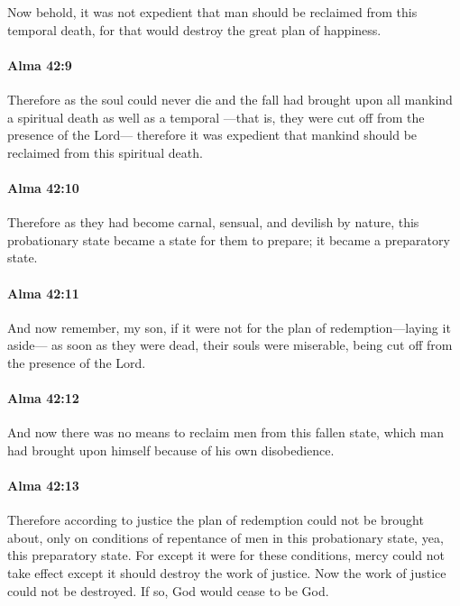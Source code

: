 			Now behold, it was not expedient
			that man should be reclaimed from this temporal death,
			for that would destroy the great plan of happiness.

		\paragraph{Alma 42:9} %
			\label{ALMA-42-9}

			Therefore as the soul could never die
			and the fall had brought upon all mankind a spiritual death as well as a temporal
			---that is, they were cut off from the presence of the Lord---
			therefore it was expedient
			that mankind should be reclaimed from this spiritual death.

		\paragraph{Alma 42:10} %
			\label{ALMA-42-10}

			Therefore as they had become carnal, sensual, and devilish by nature,
			this probationary state became a state for them to prepare;
			it became a preparatory state.

		\paragraph{Alma 42:11} %
			\label{ALMA-42-11}

			And now remember, my son,
			if it were not for the plan of redemption---laying it aside---
			as soon as they were dead,
			their souls were miserable,
			being cut off from the presence of the Lord.

		\paragraph{Alma 42:12} %
			\label{ALMA-42-12}

			And now there was no means to reclaim men from this fallen state,
			which man had brought upon himself because of his own disobedience.

		\paragraph{Alma 42:13} %
			\label{ALMA-42-13}

			Therefore according to justice
			the plan of redemption could not be brought about,
			only on conditions of repentance of men in this probationary state,
			yea, this preparatory state.
			For except it were for these conditions,
			mercy could not take effect except it should destroy the work of justice.
			Now the work of justice could not be destroyed.
			If so, God would cease to be God.

